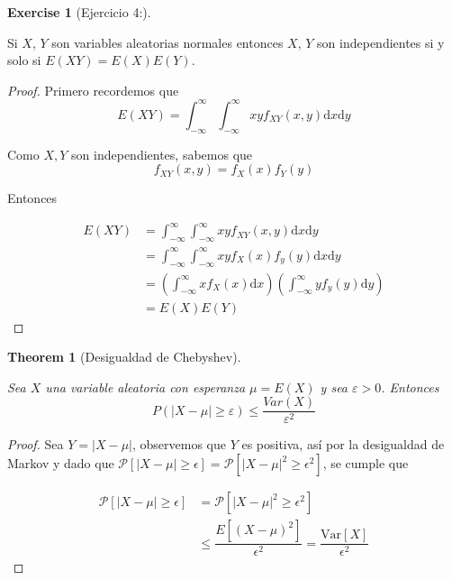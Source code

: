 \documentclass[
  letterpaper,
  DIV=11,
  numbers=noendperiod]{scrreprt}
\theoremstyle{plain}
\newtheorem{theorem}{Theorem}[chapter]
\theoremstyle{definition}
\newtheorem{exercise}{Exercise}[chapter]
\theoremstyle{remark}
\begin{document}
\begin{exercise}[Ejercicio 4:]\protect\hypertarget{exr-4}{}\label{exr-4}

Si \(X\), \(Y\) son variables aleatorias normales entonces \(X\), \(Y\)
son independientes si y solo si \(E(XY)=E(X)E(Y)\).

\end{exercise}

\begin{proof}

Primero recordemos que \[
E\left(XY\right)=\int_{-\infty}^{\infty}\int_{-\infty}^{\infty}xyf_{XY}\left(x,y\right)\mathrm{d}x\mathrm{d}y
\]

Como \(X,Y\) son independientes, sabemos que \[
f_{XY}\left(x,y\right)=f_{X}\left(x\right)f_{Y}\left(y\right)
\]

Entonces

\[
\begin{align*}
E\left(XY\right) & =\int_{-\infty}^{\infty}\int_{-\infty}^{\infty}xyf_{XY}\left(x,y\right)\mathrm{d}x\mathrm{d}y\\
& =\int_{-\infty}^{\infty}\int_{-\infty}^{\infty}xyf_{X}\left(x\right)f_{y}\left(y\right)\mathrm{d}x\mathrm{d}y\\
& =\left(\int_{-\infty}^{\infty}xf_{X}\left(x\right)\mathrm{d}x\right)\left(\int_{-\infty}^{\infty}yf_{y}\left(y\right)\mathrm{d}y\right)\\
& =E\left(X\right)E\left(Y\right)
\end{align*}
\]

\end{proof}

\begin{theorem}[Desigualdad de
Chebyshev]\protect\hypertarget{thm-5.1}{}\label{thm-5.1}

Sea \(X\) una variable aleatoria con esperanza \(\mu=E(X)\) y sea
\(\varepsilon>0\). Entonces \[
P(|X-\mu|\geq\varepsilon)\leq\frac{Var(X)}{\varepsilon^{2}}
\]

\end{theorem}

\begin{proof}

Sea \(Y=\left|X-\mu\right|\), observemos que \(Y\) es positiva, así por
la desigualdad de Markov y dado que
\(\mathcal{P}\left[\left|X-\mu\right|\geq\epsilon\right] =\mathcal{P}\left[\left|X-\mu\right|^{2}\geq\epsilon^{2}\right]\),
se cumple que

\[
\begin{align*}
\mathcal{P}\left[\left|X-\mu\right|\geq\epsilon\right] & =\mathcal{P}\left[\left|X-\mu\right|^{2}\geq\epsilon^{2}\right]\\
& \leq\dfrac{E\left[\left(X-\mu\right)^{2}\right]}{\epsilon^{2}}=\dfrac{\text{Var}\left[X\right]}{\epsilon^{2}}
\end{align*}
\]

\end{proof}
\end{document}
